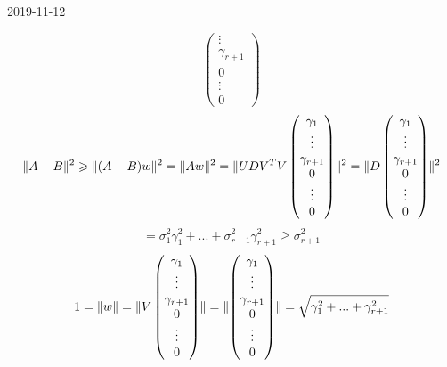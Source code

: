 \documentclass[main.tex]{subfiles}
\begin{document}
\begin{lect}{2019-11-12}
\begin{Proof}
\[\begin{pmatrix}
            \vdots\\
            \gamma_{r + 1}\\
            0\\
            \vdots\\
            0
        \end{pmatrix}\]
        \[\lVert A - B \rVert^2 \geqslant \lVert (A - B)w \rVert^2 = \lVert Aw \rVert^2 = \lVert UDV^{T}V \begin{pmatrix}
            \gamma_1\\
            \vdots\\
            \gamma_{r + 1}\\
            0\\
            \vdots\\
            0
        \end{pmatrix} \rVert^2 = \lVert D \begin{pmatrix}
            \gamma_1\\
            \vdots\\
            \gamma_{r + 1}\\
            0\\
            \vdots\\
            0
        \end{pmatrix} \rVert^2\]
        \[= \sigma_1^2 \gamma_1^2 + ... + \sigma_{r + 1}^2 \gamma_{r + 1}^2 \geq
        \sigma_{r + 1}^2 \]
        \[1 = \lVert w \rVert = \lVert V \begin{pmatrix}
            \gamma_1\\
            \vdots\\
            \gamma_{r + 1}\\
            0\\
            \vdots\\
            0
        \end{pmatrix} \rVert = \lVert \begin{pmatrix}
            \gamma_1\\
            \vdots\\
            \gamma_{r + 1}\\
            0\\
            \vdots\\
            0
        \end{pmatrix} \rVert = \sqrt{\gamma_1^2 + ... + \gamma_{r + 1}^2} \]
    \end{Proof}


\end{lect}
\end{document}
